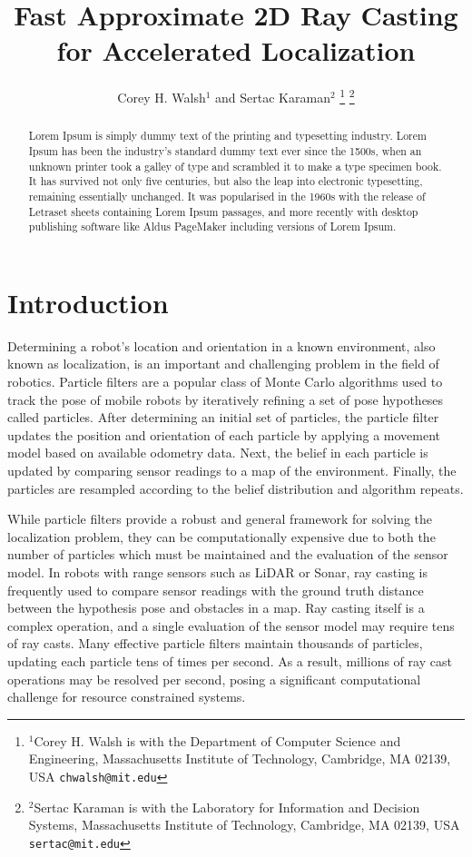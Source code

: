 \documentclass[letterpaper, 10 pt, conference]{ieeeconf}  %
\title{\LARGE \bf
Fast Approximate 2D Ray Casting for Accelerated Localization
}
\author{Corey H. Walsh$^{1}$ and Sertac Karaman$^{2}$%
\thanks{$^{1}$Corey H. Walsh is with the Department of Computer Science and Engineering, Massachusetts Institute of Technology,
        Cambridge, MA 02139, USA
        {\tt\small chwalsh@mit.edu}}%
\thanks{$^{2}$Sertac Karaman is with the Laboratory for Information and Decision Systems, Massachusetts Institute of Technology,
        Cambridge, MA 02139, USA
        {\tt\small sertac@mit.edu}}%
}
\begin{document}
\maketitle
\thispagestyle{empty}
\pagestyle{empty}

\begin{abstract}


Lorem Ipsum is simply dummy text of the printing and typesetting industry. Lorem Ipsum has been the industry's standard dummy text ever since the 1500s, when an unknown printer took a galley of type and scrambled it to make a type specimen book. It has survived not only five centuries, but also the leap into electronic typesetting, remaining essentially unchanged. It was popularised in the 1960s with the release of Letraset sheets containing Lorem Ipsum passages, and more recently with desktop publishing software like Aldus PageMaker including versions of Lorem Ipsum.


\end{abstract}


\section{Introduction}

Determining a robot's location and orientation in a known environment, also known as localization, is an important and challenging problem in the field of robotics. Particle filters are a popular class of Monte Carlo algorithms used to track the pose of mobile robots by iteratively refining a set of pose hypotheses called particles. After determining an initial set of particles, the particle filter updates the position and orientation of each particle by applying a movement model based on available odometry data. Next, the belief in each particle is updated by comparing sensor readings to a map of the environment. Finally, the particles are resampled according to the belief distribution and algorithm repeats.

While particle filters provide a robust and general framework for solving the localization problem, they can be computationally expensive due to both the number of particles which must be maintained and the evaluation of the sensor model. In robots with range sensors such as LiDAR or Sonar, ray casting is frequently used to compare sensor readings with the ground truth distance between the hypothesis pose and obstacles in a map. Ray casting itself is a complex operation, and a single evaluation of the sensor model may require tens of ray casts. Many effective particle filters maintain thousands of particles, updating each particle tens of times per second. As a result, millions of ray cast operations may be resolved per second, posing a significant computational challenge for resource constrained systems.
\end{document}
